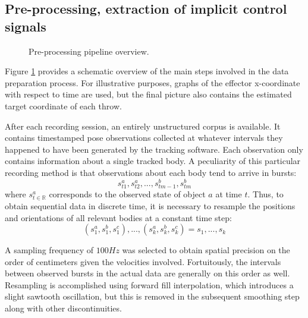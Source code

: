 \documentclass{article}
\begin{document}
\subsection{Pre-processing, extraction of implicit control signals}
\label{sec:preprocess}

\begin{figure}
	\centering
	\caption{Pre-processing pipeline overview.}
	\label{fig:fig2}
\end{figure}

Figure \ref{fig:fig2} provides a schematic overview of the main steps involved in the data preparation process. For illustrative purposes, graphs of the effector x-coordinate with respect to time are used, but the final picture also contains the estimated target coordinate of each throw.

After each recording session, an entirely unstructured corpus is available. It contains timestamped pose observations collected at whatever intervals they happened to have been generated by the tracking software. Each observation only contains information about a single tracked body. A peculiarity of this particular recording method is that observations about each body tend to arrive in bursts:
\begin{equation}
    s^a_{t1}, s^a_{t2}, ..., s^b_{tm-1}, s^b_{tm}
\end{equation}
where $s^a_{t \in \mathbb{R}}$ corresponds to the observed state of object $a$ at time $t$.
Thus, to obtain sequential data in discrete time, it is necessary to resample the positions and orientations of all relevant bodies at a constant time step:
\begin{equation}
    (s^a_{1}, s^b_{1}, s^c_{1}), ..., (s^a_{k}, s^b_{k}, s^c_{k}) = s_1, ..., s_k
\end{equation}

A sampling frequency of $100Hz$ was selected to obtain spatial precision on the order of centimeters given the velocities involved. Fortuitously, the intervals between observed bursts in the actual data are generally on this order as well. Resampling is accomplished using forward fill interpolation, which introduces a slight sawtooth oscillation, but this is removed in the subsequent smoothing step along with other discontinuities.
\end{document}
